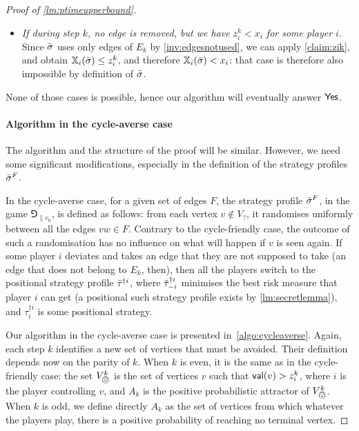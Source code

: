 \begin{proof}[Proof of \cref{lm:ptimeupperbound}]
\begin{claimproof}
\begin{itemize}
                \item \emph{If during step $k$, no edge is removed, but we have $z^k_i < x_i$ for some player $i$.}
                Since ${\bar{\sigma}}$ uses only edges of $E_k$ by \cref{inv:edgesnotused}, we can apply \cref{claim:zik}, and obtain $\mathbb{X}_i({\bar{\sigma}}) \leq z^k_i$, and therefore $\mathbb{X}_i({\bar{\sigma}}) < x_i$: that case is therefore also impossible by definition of ${\bar{\sigma}}$.
            \end{itemize}
        None of those cases is possible, hence our algorithm will eventually answer $\mathsf{Yes}$.
    \end{claimproof}

 




    \paragraph*{Algorithm in the cycle-averse case}

    The algorithm and the structure of the proof will be similar.
    However, we need some significant modifications, especially in the definition of the strategy profiles ${\bar{\sigma}}^F$.

    In the cycle-averse case, for a given set of edges $F$, the strategy profile ${\bar{\sigma}}^F$, in the game $\Game_{\|v_0}$, is defined as follows: from each vertex $v \not\in V_?$, it randomises uniformly between all the edges $vw \in F$. Contrary to the cycle-friendly case, the outcome of such a randomisation has no influence on what will happen if $v$ is seen again.
    If some player $i$ deviates and takes an edge that they are not supposed to take (an edge that does not belong to $E_k$, then), then all the players switch to the positional strategy profile ${\bar{\tau}}^{\dag i}$, where ${\bar{\tau}}^{\dag i}_{-i}$ minimises the best risk measure that player $i$ can get (a positional such strategy profile exists by \cref{lm:secretlemma}), and $\tau^{\dag i}_i$ is some positional strategy.
 
    Our algorithm in the cycle-averse case is presented in~\cref{algo:cycleaverse}.
    Again, each step $k$ identifies a new set of vertices that must be avoided.
    Their definition depends now on the parity of $k$.
    When $k$ is even, it is the same as in the cycle-friendly case: the set $V^k_\bad$ is the set of vertices $v$ such that $\mathsf{val}(v) > z_i^k$, where $i$ is the player controlling $v$, and $A_k$ is the positive probabilistic attractor of $V_\bad^k$.
    When $k$ is odd, we define directly $A_k$ as the set of vertices from which whatever the players play, there is a positive probability of reaching no terminal vertex.
    

\end{proof}
